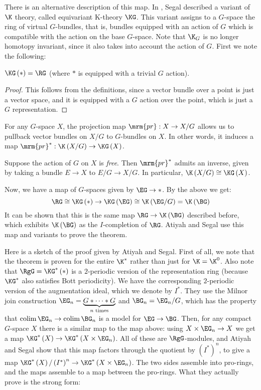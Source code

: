 There is an alternative description of this map.
In \cite{Seg}, Segal described a variant of$\K$ theory, called equivariant K-theory $\KG$.
This variant assigns to a $G$-space the ring of virtual $G$-bundles, that is, bundles equipped with an action of $G$ which is compatible with the action on the base $G$-space.
Note that $\K_G$ is no longer homotopy invariant, since it also takes into account the action of $G$.
First we note the following:

\begin{proposition}
	$\KG\left(*\right) = \RG$ (where $*$ is equipped with a trivial $G$ action).
\end{proposition}

\begin{proof}
	This follows from the definitions, since a vector bundle over a point is just a vector space, and it is equipped with a $G$ action over the point, which is just a $G$ representation.
\end{proof}

For any $G$-space $X$, the projection map $\mrm{pr}: X \to X/G$ allows us to pullback vector bundles on $X/G$ to $G$-bundles on $X$.
In other words, it induces a map $\mrm{pr}^*: \K\left(X/G\right) \to \KG\left(X\right)$.

\begin{proposition}
	Suppose the action of $G$ on $X$ is \emph{free}. Then $\mrm{pr}^*$ admits an inverse, given by taking a bundle $E \to X$ to $E/G \to X/G$.
	In particular, $\K\left(X/G\right) \cong \KG\left(X\right)$.
\end{proposition}

Now, we have a map of $G$-spaces given by $\EG \to *$.
By the above we get:
$$
\RG
\cong \KG\left(*\right)
\to \KG\left(\EG\right)
\cong \K\left(\EG/G\right)
= \K\left(\BG\right)
$$
It can be shown that this is the same map $\RG \to \K\left(\BG\right)$ described before, which exhibits $\K\left(\BG\right)$ as the $I$-completion of $\RG$.
Atiyah and Segal use this map and variants to prove the theorem.

Here is a sketch of the proof given by Atiyah and Segal.
First of all, we note that the theorem is proven for the entire $\K^*$ rather than just for $\K = \K^0$.
Also note that $\RgG = \KG^*\left(*\right)$ is a $2$-periodic version of the representation ring (because $\KG^*$ also satisfies Bott periodicity).
We have the corresponding $2$-periodic version of the augmentation ideal, which we denote by $I^*$.
They use the Milnor join construction $\EG_n = \underbrace{G * \cdots * G}_{n \text{ times}}$ and $\BG_n = \EG_n/G$, which has the property that $\colim \EG_n \to \colim \BG_n$ is a model for $\EG \to \BG$.
Then, for any compact $G$-space $X$ there is a similar map to the map above: using $X \times \EG_n \to X$ we get a map $\KG^*\left(X\right) \to \KG^*\left(X \times \EG_n\right)$.
All of these are $\RgG$-modules, and Atiyah and Segal show that this map factors through the quotient by $\left(I^*\right)^n$, to give a map $\KG^*\left(X\right)/\left(I^*\right)^n \to \KG^*\left(X \times \EG_n\right)$.
The two sides assemble into pro-rings, and the maps assemble to a map between the pro-rings.
What they actually prove is the strong form:

